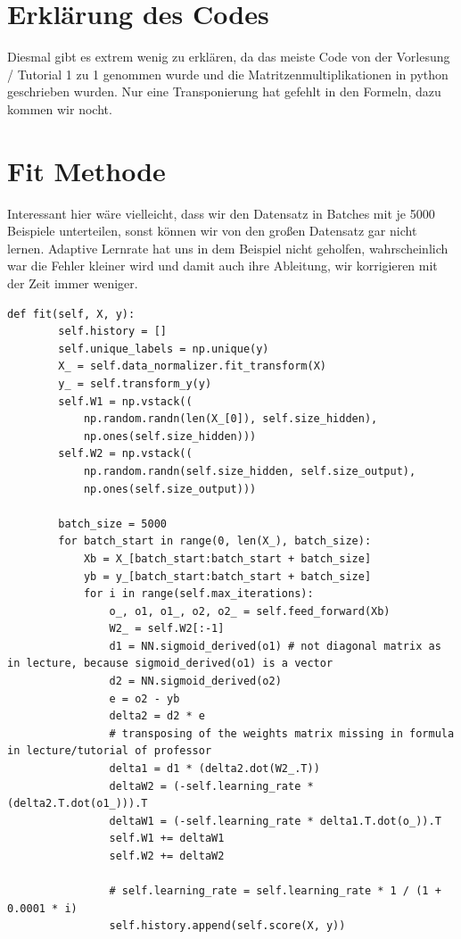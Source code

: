 \section*{Erklärung des Codes}
Diesmal gibt es extrem wenig zu erklären, da das meiste Code von der Vorlesung / Tutorial
1 zu 1 genommen wurde und die Matritzenmultiplikationen in python geschrieben wurden. Nur eine Transponierung
hat gefehlt in den Formeln, dazu kommen wir nocht.

\section*{Fit Methode}

Interessant hier wäre vielleicht, dass wir den Datensatz in Batches mit je 5000 Beispiele unterteilen, sonst
können wir von den großen Datensatz gar nicht lernen. Adaptive Lernrate hat uns in dem Beispiel nicht geholfen,
wahrscheinlich war die Fehler kleiner wird und damit auch ihre Ableitung, wir korrigieren mit der Zeit immer
weniger.

\begin{lstlisting}[style=py]
    def fit(self, X, y):
        self.history = []
        self.unique_labels = np.unique(y)
        X_ = self.data_normalizer.fit_transform(X)
        y_ = self.transform_y(y)
        self.W1 = np.vstack((
            np.random.randn(len(X_[0]), self.size_hidden),
            np.ones(self.size_hidden)))
        self.W2 = np.vstack((
            np.random.randn(self.size_hidden, self.size_output),
            np.ones(self.size_output)))

        batch_size = 5000
        for batch_start in range(0, len(X_), batch_size):
            Xb = X_[batch_start:batch_start + batch_size]
            yb = y_[batch_start:batch_start + batch_size]
            for i in range(self.max_iterations):
                o_, o1, o1_, o2, o2_ = self.feed_forward(Xb)
                W2_ = self.W2[:-1]
                d1 = NN.sigmoid_derived(o1) # not diagonal matrix as in lecture, because sigmoid_derived(o1) is a vector
                d2 = NN.sigmoid_derived(o2)
                e = o2 - yb
                delta2 = d2 * e
                # transposing of the weights matrix missing in formula in lecture/tutorial of professor
                delta1 = d1 * (delta2.dot(W2_.T))
                deltaW2 = (-self.learning_rate * (delta2.T.dot(o1_))).T
                deltaW1 = (-self.learning_rate * delta1.T.dot(o_)).T
                self.W1 += deltaW1
                self.W2 += deltaW2

                # self.learning_rate = self.learning_rate * 1 / (1 + 0.0001 * i)
                self.history.append(self.score(X, y))
\end{lstlisting}

